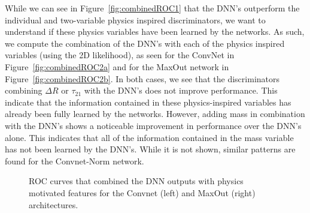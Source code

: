 While we can see in Figure~\ref{fig:combinedROC1} that the DNN's outperform the individual and two-variable physics inspired discriminators, we want to understand if these physics variables have been learned by the networks.  As such, we compute the combination of the DNN's with each of the physics inspired variables (using the 2D likelihood), as seen for the ConvNet in Figure~\ref{fig:combinedROC2a} and for the MaxOut network in Figure~\ref{fig:combinedROC2b}. In both cases, we see that the discriminators combining $\Delta R$ or $\tau_{21}$ with the DNN's does not improve performance.  This indicate that the information contained in these physics-inspired variables  has already been fully learned by the networks.  However, adding mass in combination with the DNN's shows a noticeable improvement in performance over the DNN's alone.  This indicates that all of the information contained in the mass variable has not been learned by the DNN's.  While it is not shown, similar patterns are found for the Convnet-Norm network.
\begin{figure}[!htbp]
  \begin{center}
\end{center}
  \caption{ROC curves that combined the DNN outputs with physics motivated features for the Convnet (left) and MaxOut (right) architectures.}
  \label{fig:combinedROC2}
\end{figure}

